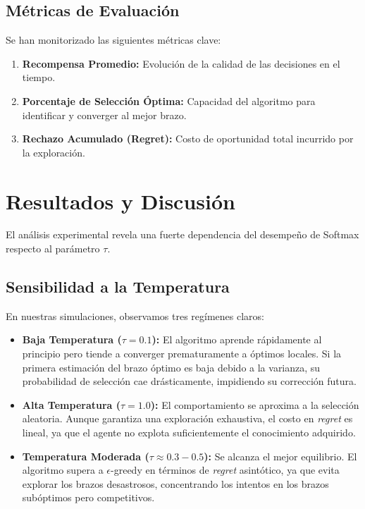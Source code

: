 \documentclass[a4paper,11pt]{article}
\begin{document}
\subsection{Métricas de Evaluación}
Se han monitorizado las siguientes métricas clave:
\begin{enumerate}
    \item \textbf{Recompensa Promedio:} Evolución de la calidad de las decisiones en el tiempo.
    \item \textbf{Porcentaje de Selección Óptima:} Capacidad del algoritmo para identificar y converger al mejor brazo.
    \item \textbf{Rechazo Acumulado (Regret):} Costo de oportunidad total incurrido por la exploración.
\end{enumerate}

\section{Resultados y Discusión}

El análisis experimental revela una fuerte dependencia del desempeño de Softmax respecto al parámetro $\tau$.

\subsection{Sensibilidad a la Temperatura}
En nuestras simulaciones, observamos tres regímenes claros:
\begin{itemize}
    \item \textbf{Baja Temperatura ($\tau=0.1$):} El algoritmo aprende rápidamente al principio pero tiende a converger prematuramente a óptimos locales. Si la primera estimación del brazo óptimo es baja debido a la varianza, su probabilidad de selección cae drásticamente, impidiendo su corrección futura.
    \item \textbf{Alta Temperatura ($\tau=1.0$):} El comportamiento se aproxima a la selección aleatoria. Aunque garantiza una exploración exhaustiva, el costo en \textit{regret} es lineal, ya que el agente no explota suficientemente el conocimiento adquirido.
    \item \textbf{Temperatura Moderada ($\tau \approx 0.3 - 0.5$):} Se alcanza el mejor equilibrio. El algoritmo supera a $\epsilon$-greedy en términos de \textit{regret} asintótico, ya que evita explorar los brazos desastrosos, concentrando los intentos en los brazos subóptimos pero competitivos.
\end{itemize}
\end{document}
